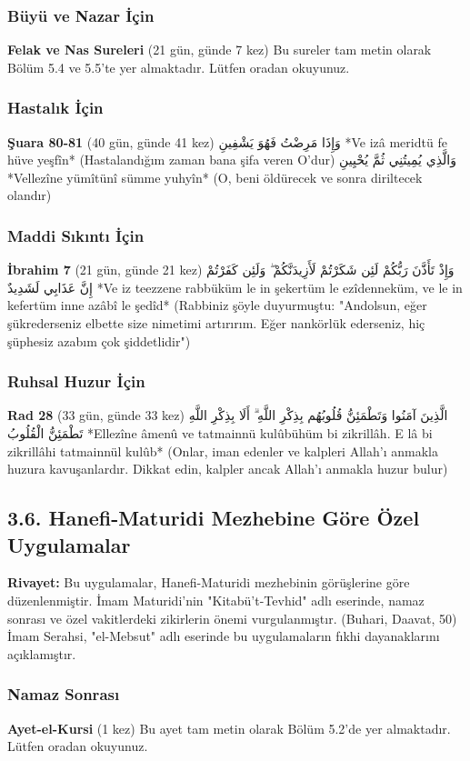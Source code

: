 \documentclass[12pt,a4paper]{article}
\begin{document}
\subsubsection{Büyü ve Nazar İçin}
\textbf{Felak ve Nas Sureleri} (21 gün, günde 7 kez)
Bu sureler tam metin olarak Bölüm 5.4 ve 5.5'te yer almaktadır. Lütfen oradan okuyunuz.
\subsubsection{Hastalık İçin}
\textbf{Şuara 80-81} (40 gün, günde 41 kez)
وَإِذَا مَرِضْتُ فَهُوَ يَشْفِينِ
*Ve izâ meridtü fe hüve yeşfîn*
(Hastalandığım zaman bana şifa veren O'dur)
وَالَّذِي يُمِيتُنِي ثُمَّ يُحْيِينِ
*Vellezîne yümîtünî sümme yuhyîn*
(O, beni öldürecek ve sonra diriltecek olandır)
\subsubsection{Maddi Sıkıntı İçin}
\textbf{İbrahim 7} (21 gün, günde 21 kez)
وَإِذْ تَأَذَّنَ رَبُّكُمْ لَئِن شَكَرْتُمْ لَأَزِيدَنَّكُمْ ۖ وَلَئِن كَفَرْتُمْ إِنَّ عَذَابِي لَشَدِيدٌ
*Ve iz teezzene rabbüküm le in şekertüm le ezîdenneküm, ve le in kefertüm inne azâbî le şedîd*
(Rabbiniz şöyle duyurmuştu: "Andolsun, eğer şükrederseniz elbette size nimetimi artırırım. Eğer nankörlük ederseniz, hiç şüphesiz azabım çok şiddetlidir")
\subsubsection{Ruhsal Huzur İçin}
\textbf{Rad 28} (33 gün, günde 33 kez)
الَّذِينَ آمَنُوا وَتَطْمَئِنُّ قُلُوبُهُم بِذِكْرِ اللَّهِ ۗ أَلَا بِذِكْرِ اللَّهِ تَطْمَئِنُّ الْقُلُوبُ
*Ellezîne âmenû ve tatmainnü kulûbühüm bi zikrillâh. E lâ bi zikrillâhi tatmainnül kulûb*
(Onlar, iman edenler ve kalpleri Allah'ı anmakla huzura kavuşanlardır. Dikkat edin, kalpler ancak Allah'ı anmakla huzur bulur)
\subsection{3.6. Hanefi-Maturidi Mezhebine Göre Özel Uygulamalar}
\textbf{Rivayet:} Bu uygulamalar, Hanefi-Maturidi mezhebinin görüşlerine göre düzenlenmiştir. İmam Maturidi'nin "Kitabü't-Tevhid" adlı eserinde, namaz sonrası ve özel vakitlerdeki zikirlerin önemi vurgulanmıştır. (Buhari, Daavat, 50) İmam Serahsi, "el-Mebsut" adlı eserinde bu uygulamaların fıkhi dayanaklarını açıklamıştır.
\subsubsection{Namaz Sonrası}
\textbf{Ayet-el-Kursi} (1 kez)
Bu ayet tam metin olarak Bölüm 5.2'de yer almaktadır. Lütfen oradan okuyunuz.
\end{document}
